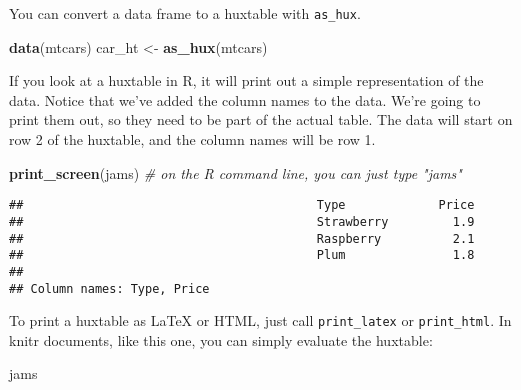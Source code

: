 \documentclass[]{article}
\newenvironment{Shaded}{\begin{snugshade}}{\end{snugshade}}
\newcommand{\CommentTok}[1]{\textcolor[rgb]{0.56,0.35,0.01}{\textit{#1}}}
\newcommand{\KeywordTok}[1]{\textcolor[rgb]{0.13,0.29,0.53}{\textbf{#1}}}
\newcommand{\NormalTok}[1]{#1}
\newcommand{\StringTok}[1]{\textcolor[rgb]{0.31,0.60,0.02}{#1}}
\begin{document}
\FloatBarrier

You can convert a data frame to a huxtable with \texttt{as\_hux}.

\begin{Shaded}
\begin{Highlighting}[]
\KeywordTok{data}\NormalTok{(mtcars)}
\NormalTok{car_ht <-}\StringTok{ }\KeywordTok{as_hux}\NormalTok{(mtcars)}
\end{Highlighting}
\end{Shaded}

\FloatBarrier

If you look at a huxtable in R, it will print out a simple
representation of the data. Notice that we've added the column names to
the data. We're going to print them out, so they need to be part of the
actual table. The data will start on row 2 of the huxtable, and the
column names will be row 1.

\begin{Shaded}
\begin{Highlighting}[]
\KeywordTok{print_screen}\NormalTok{(jams)     }\CommentTok{# on the R command line, you can just type "jams"}
\end{Highlighting}
\end{Shaded}

\begin{verbatim}
##                                         Type             Price  
##                                         Strawberry         1.9  
##                                         Raspberry          2.1  
##                                         Plum               1.8  
## 
## Column names: Type, Price
\end{verbatim}

\FloatBarrier

To print a huxtable as LaTeX or HTML, just call \texttt{print\_latex} or
\texttt{print\_html}. In knitr documents, like this one, you can simply
evaluate the huxtable:

\begin{Shaded}
\begin{Highlighting}[]
\NormalTok{jams}
\end{Highlighting}
\end{Shaded}

 
  \providecommand{\huxb}[2]{\arrayrulecolor[RGB]{#1}\global\arrayrulewidth=#2pt}
  \providecommand{\huxvb}[2]{\color[RGB]{#1}\vrule width #2pt}
  \providecommand{\huxtpad}[1]{\rule{0pt}{#1}}
  \providecommand{\huxbpad}[1]{\rule[-#1]{0pt}{#1}}
\end{document}
